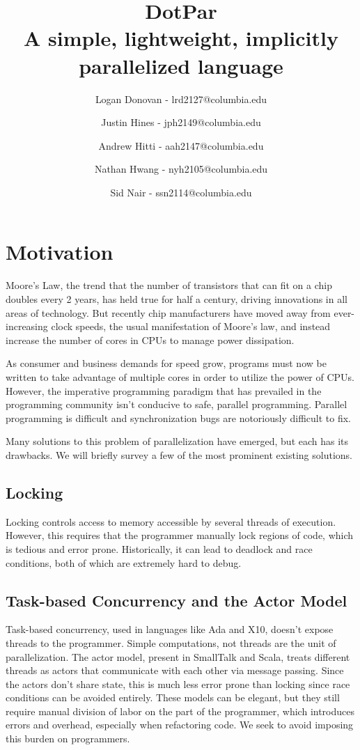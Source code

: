 \documentclass{article}
\begin{document}
\title{DotPar \\ A simple, lightweight, implicitly parallelized language}
\author{Logan Donovan - lrd2127@columbia.edu \and
Justin Hines - jph2149@columbia.edu \and
Andrew Hitti - aah2147@columbia.edu \and
Nathan Hwang - nyh2105@columbia.edu \and
Sid Nair - ssn2114@columbia.edu}
\maketitle


\section{Motivation}
Moore’s Law, the trend that the number of transistors that can fit on
a chip doubles every 2 years, has held true for half a century,
driving innovations in all areas of technology. But recently chip
manufacturers have moved away from ever-increasing clock speeds, the
usual manifestation of Moore’s law, and instead increase the number of
cores in CPUs to manage power dissipation.

As consumer and business demands for speed grow, programs must now be
written to take advantage of multiple cores in order to utilize the
power of CPUs. However, the imperative programming paradigm that has
prevailed in the programming community isn’t conducive to safe,
parallel programming. Parallel programming is difficult and
synchronization bugs are notoriously difficult to fix.

Many solutions to this problem of parallelization have emerged, but
each has its drawbacks. We will briefly survey a few of the most
prominent existing solutions.

\subsection{Locking}
Locking controls access to memory accessible by several threads of
execution. However, this requires that the programmer manually lock
regions of code, which is tedious and error prone.  Historically, it
can lead to deadlock and race conditions, both of which are extremely
hard to debug.

\subsection{Task-based Concurrency and the Actor Model}
Task-based concurrency, used in languages like Ada and X10, doesn’t
expose threads to the programmer. Simple computations, not threads are
the unit of parallelization. The actor model, present in SmallTalk and
Scala, treats different threads as actors that communicate with each
other via message passing. Since the actors don’t share state, this is
much less error prone than locking since race conditions can be
avoided entirely. These models can be elegant, but they still require
manual division of labor on the part of the programmer, which
introduces errors and overhead, especially when refactoring code. We
seek to avoid imposing this burden on programmers.
\end{document}
